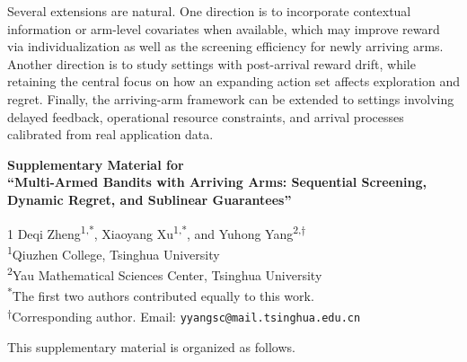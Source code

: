 \documentclass[11pt]{article}
\newcommand{\anon}{1}
\begin{document}
Several extensions are natural. One direction is to incorporate contextual information or arm-level covariates when  available, which may improve reward via individualization as well as the screening efficiency for newly arriving arms. Another direction is to study settings with post-arrival reward drift, while retaining the central focus on how an expanding action set affects exploration and regret. Finally, the arriving-arm framework can be extended to settings involving delayed feedback, operational resource constraints, and arrival processes calibrated from real application data.

\printbibliography


\newpage

\label{supplementary-material}
\bigskip


\clearpage
\appendix
\setcounter{page}{1}
\renewcommand{\thepage}{S-\arabic{page}}


\begin{center}

{\large\bf Supplementary Material for \\ “Multi-Armed Bandits with Arriving Arms: Sequential Screening, Dynamic Regret, and Sublinear Guarantees”}

\anon
Deqi Zheng\textsuperscript{1,*},
Xiaoyang Xu\textsuperscript{1,*},
and Yuhong Yang\textsuperscript{2,$\dagger$}\\[0.4em]

\textsuperscript{1}Qiuzhen College, Tsinghua University\\
\textsuperscript{2}Yau Mathematical Sciences Center, Tsinghua University\\[0.4em]
{\footnotesize
\textsuperscript{*}The first two authors contributed equally to this work.\\
\textsuperscript{$\dagger$}Corresponding author. Email: \texttt{yyangsc@mail.tsinghua.edu.cn}
}
\fi

\end{center}

This supplementary material is organized as follows.
\end{document}
